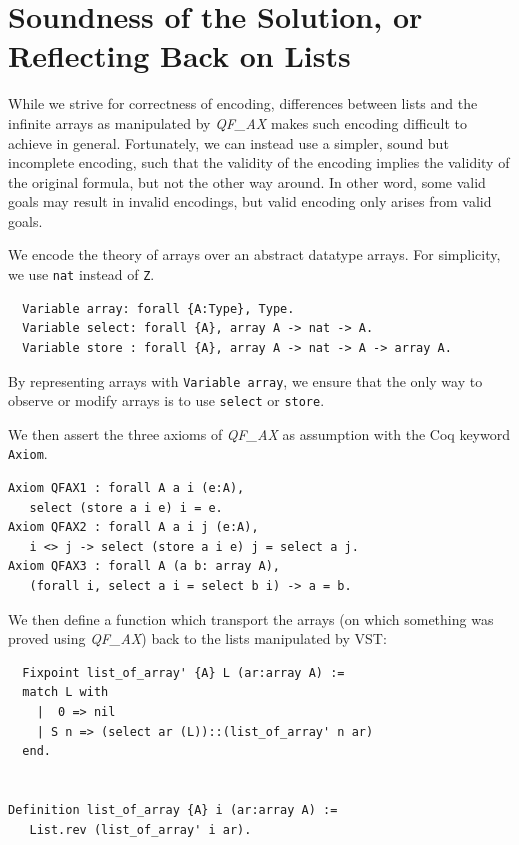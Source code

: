 \documentclass[onecolumn, preprint]{sigplanconf}
\begin{document}
\section{Soundness of the Solution, or Reflecting Back on Lists}
\label{sec:proofs}
While we strive for correctness of encoding, differences between lists
and the infinite arrays as manipulated by \emph{QF\_AX} makes such encoding difficult to achieve in general. 
Fortunately, we can instead use a simpler, sound but incomplete encoding, such that the validity 
of the encoding implies the validity of the original formula, but not the other way around.
In other word, some valid goals may result in invalid encodings, but valid encoding only arises from valid goals.


We encode the theory of arrays over an abstract datatype arrays. For simplicity, we use \texttt{nat} instead of \texttt{Z}.  
\begin{lstlisting}
  Variable array: forall {A:Type}, Type.
  Variable select: forall {A}, array A -> nat -> A.
  Variable store : forall {A}, array A -> nat -> A -> array A.
\end{lstlisting}
By representing arrays with \texttt{Variable array}, we ensure that the only way to observe or modify arrays is to use \texttt{select} or \texttt{store}.

We then assert the three axioms of \emph{QF\_AX} as assumption with the Coq keyword \texttt{Axiom}.

\begin{lstlisting}
Axiom QFAX1 : forall A a i (e:A),
   select (store a i e) i = e.  
Axiom QFAX2 : forall A a i j (e:A),
   i <> j -> select (store a i e) j = select a j.  
Axiom QFAX3 : forall A (a b: array A),
   (forall i, select a i = select b i) -> a = b.  
\end{lstlisting}

We then define a function which transport the arrays (on which something was proved using \emph{QF\_AX}) back to the lists manipulated by VST:

\begin{lstlisting}
  Fixpoint list_of_array' {A} L (ar:array A) :=
  match L with
    |  0 => nil
    | S n => (select ar (L))::(list_of_array' n ar)
  end.


Definition list_of_array {A} i (ar:array A) :=
   List.rev (list_of_array' i ar).
\end{lstlisting}
\end{document}
